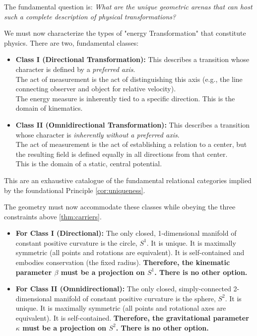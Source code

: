 \documentclass[12pt, a4paper]{article}
\begin{document}
The fundamental question is: \textit{What are the unique geometric arenas that can host such a complete description of physical transformations?}

We must now characterize the types of "energy Transformation" that constitute physics. 
There are two,  fundamental classes:
\begin{itemize}
    \item \textbf{Class I (Directional Transformation):} This describes a transition whose character is defined by a \textit{preferred axis}. \\ 
    The act of measurement is the act of distinguishing this axis (e.g., the line connecting observer and object for relative velocity). \\
    The energy measure is inherently tied to a specific direction. This is the domain of kinematics.
    \item \textbf{Class II (Omnidirectional Transformation):} This describes a transition whose character is \textit{inherently without a preferred axis}. \\
    The act of measurement is the act of establishing a relation to a center, but the resulting field is defined equally in all directions from that center. \\
    This is the domain of a static, central potential.
\end{itemize}

This are an exhaustive catalogue of the fundamental relational categories implied by the foundational Principle \ref{cor:uniqueness}. 

The geometry must now accommodate these classes while obeying the three constraints above \ref{thm:carriers}.
\begin{itemize}
    \item \textbf{For Class I (Directional):} The only closed, 1-dimensional manifold of constant positive curvature is the circle, \(S^1\). It is unique. It is maximally symmetric (all points and rotations are equivalent). It is self-contained and embodies conservation (the fixed radius). \textbf{Therefore, the kinematic parameter \(\beta\) must be a projection on \(S^1\). There is no other option.}
    \item \textbf{For Class II (Omnidirectional):} The only closed, simply-connected 2-dimensional manifold of constant positive curvature is the sphere, \(S^2\). It is unique. It is maximally symmetric (all points and rotational axes are equivalent). It is self-contained. \textbf{Therefore, the gravitational parameter \(\kappa\) must be a projection on \(S^2\). There is no other option.}
\end{itemize}
\end{document}
